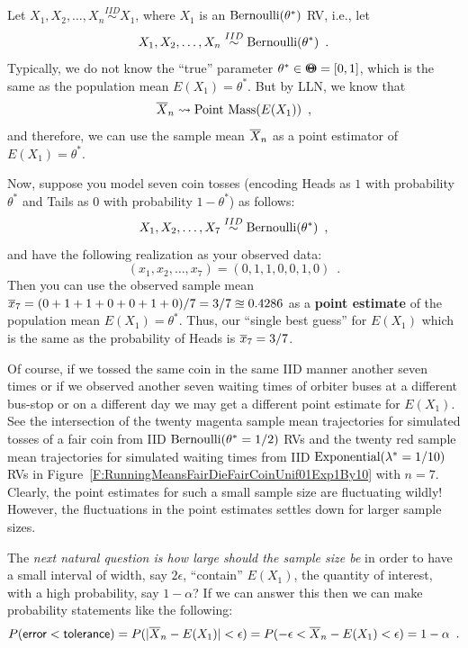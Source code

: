 \begin{example}\label{Eg:LLNBernoulli}
Let $X_1,X_2,\ldots, X_n \overset{IID}{\sim} X_1$, where $X_1$ is an $\mbox{{\rm Bernoulli}}(\theta^*)$ RV, i.e., let
\[
X_1,X_2,\ldots, X_n \overset{IID}{\sim} \mbox{{\rm Bernoulli}}(\theta^*) \enspace .
\]
Typically, we do not know the ``true'' parameter $\theta^* \in {\Theta}\mspace{-11 mu}{\Theta} = [0,1]$, which is the same as the population mean $E(X_1) = \theta^*$.  
But by LLN, we know that
\[
\overline{X}_n \rightsquigarrow \mbox{{\rm Point~Mass}}(E(X_1)) \enspace ,
\]
and therefore, we can use the sample mean $\overline{X}_n$ as a point estimator of $E(X_1)= \theta^*$.  

Now, suppose you model seven coin tosses (encoding {\sf Heads} as $1$ with probability $\theta^*$ and {\sf Tails} as $0$ with probability $1-\theta^*$) as follows:
\[
X_1,X_2,\ldots, X_7 \overset{IID}{\sim} \mbox{{\rm Bernoulli}}(\theta^*) \enspace ,
\]
and have the following realization as your observed data:
\[
(x_1,x_2,\ldots,x_7) = (0,1,1,0,0,1,0) \enspace .
\]
Then you can use the observed sample mean $\overline{x}_7=(0+1+1+0+0+1+0)/7=3/7 \approxeq 0.4286$ as a {\bf point estimate} of the population mean $E(X_1)=\theta^*$.  
Thus, our ``single best guess'' for $E(X_1)$ which is the same as the probability of {\sf Heads} is $\overline{x}_7=3/7$.  
\end{example}

Of course, if we tossed the same coin in the same IID manner another seven times or if we observed another seven waiting times of orbiter buses at a different bus-stop or on a different day we may get a different point estimate for $E(X_1)$.  
See the intersection of the twenty magenta sample mean trajectories for simulated tosses of a fair coin from IID $\mbox{{\rm Bernoulli}}(\theta^*=1/2)$ RVs and the twenty red sample mean trajectories for simulated waiting times from IID $\mbox{{\rm Exponential}}(\lambda^*=1/10)$ RVs in Figure~\ref{F:RunningMeansFairDieFairCoinUnif01Exp1By10} with $n=7$.  
Clearly, the point estimates for such a small sample size are fluctuating wildly!  
However, the fluctuations in the point estimates settles down for larger sample sizes.  


The {\em next natural question is how large should the sample size be} in order to have a small interval of width, say $2 \epsilon$, ``contain'' $E(X_1)$, the quantity of interest, with a high probability, say $1-\alpha$?  If we can answer this then we can make probability statements like the following:
\[
P( \mathsf{error} < \mathsf{tolerance}) = P( |\overline{X}_n - E(X_1)| < \epsilon ) = P(-\epsilon < \overline{X}_n - E(X_1) < \epsilon) = 1-\alpha \enspace .
\]

